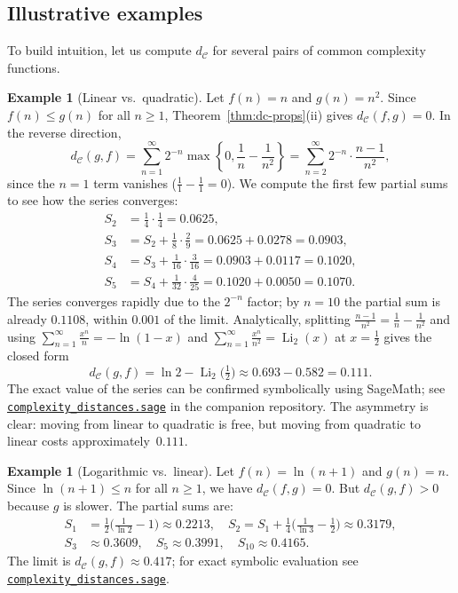 \documentclass[11pt,a4paper]{article}
\newcommand{\repourl}{https://github.com/guydev42/expansive-homeomorphisms-complexity-qmetric}
\theoremstyle{plain}
\theoremstyle{definition}
\newtheorem{exampleinner}[theoreminner]{Example}
\newenvironment{example}[1][]{\begin{exampleinner}[#1]}{\end{exampleinner}}
\newcommand{\C}{\mathcal{C}}
\begin{document}
\subsection{Illustrative examples}

To build intuition, let us compute $d_\C$ for several pairs of
common complexity functions.

\begin{example}[Linear vs.\ quadratic]\label{ex:lin-quad}
Let $f(n)=n$ and $g(n)=n^2$.  Since $f(n)\le g(n)$ for all
$n\ge 1$, Theorem~\ref{thm:dc-props}(ii) gives $d_\C(f,g)=0$.
In the reverse direction,
\[
  d_\C(g,f)
  = \sum_{n=1}^{\infty}2^{-n}\max\!\left\{0,\frac{1}{n}-\frac{1}{n^2}\right\}
  = \sum_{n=2}^{\infty}2^{-n}\cdot\frac{n-1}{n^2},
\]
since the $n=1$ term vanishes ($\frac{1}{1}-\frac{1}{1}=0$).
We compute the first few partial sums to see how the series converges:
\begin{align*}
S_2 &= \tfrac{1}{4}\cdot\tfrac{1}{4} = 0.0625, \\
S_3 &= S_2 + \tfrac{1}{8}\cdot\tfrac{2}{9}
     = 0.0625 + 0.0278 = 0.0903, \\
S_4 &= S_3 + \tfrac{1}{16}\cdot\tfrac{3}{16}
     = 0.0903 + 0.0117 = 0.1020, \\
S_5 &= S_4 + \tfrac{1}{32}\cdot\tfrac{4}{25}
     = 0.1020 + 0.0050 = 0.1070.
\end{align*}
The series converges rapidly due to the $2^{-n}$ factor; by $n=10$
the partial sum is already $0.1108$, within $0.001$ of the limit.
Analytically, splitting $\frac{n-1}{n^2}=\frac{1}{n}-\frac{1}{n^2}$ and
using $\sum_{n=1}^\infty\frac{x^n}{n}=-\!\ln(1-x)$ and
$\sum_{n=1}^\infty\frac{x^n}{n^2}=\operatorname{Li}_2(x)$ at $x=\tfrac12$
gives the closed form
\[
  d_\C(g,f) = \ln 2 - \operatorname{Li}_2\!\bigl(\tfrac12\bigr)
  \approx 0.693 - 0.582 = 0.111.
\]
The exact value of the series can be confirmed symbolically
using SageMath; see
\href{\repourl/blob/main/code/sagemath/complexity_distances.sage}{\texttt{complexity\_distances.sage}}
in the companion repository.
The asymmetry is clear: moving from linear to quadratic is free, but
moving from quadratic to linear costs approximately~$0.111$.
\end{example}

\begin{example}[Logarithmic vs.\ linear]\label{ex:log-lin}
Let $f(n)=\ln(n+1)$ and $g(n)=n$.  Since $\ln(n+1)\le n$ for all
$n\ge 1$, we have $d_\C(f,g)=0$.  But $d_\C(g,f)>0$ because $g$
is slower.  The partial sums are:
\begin{align*}
S_1 &= \tfrac{1}{2}\bigl(\tfrac{1}{\ln 2}-1\bigr) \approx 0.2213, \quad
S_2 = S_1 + \tfrac{1}{4}\bigl(\tfrac{1}{\ln 3}-\tfrac{1}{2}\bigr) \approx 0.3179, \\
S_3 &\approx 0.3609, \quad
S_5 \approx 0.3991, \quad
S_{10} \approx 0.4165.
\end{align*}
The limit is $d_\C(g,f)\approx 0.417$; for exact symbolic evaluation see
\href{\repourl/blob/main/code/sagemath/complexity_distances.sage}{\texttt{complexity\_distances.sage}}.
\end{example}
\end{document}
